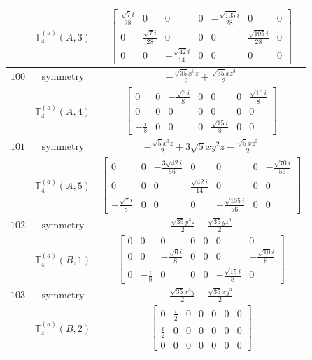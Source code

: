 \documentclass[fleqn,8pt,landscape]{jsarticle}
\begin{document}
\begin{longtable}{ccc}
$  $ & $ \mathbb{T}_{4}^{(a)}(A,3) $ & $ \begin{bmatrix} \frac{\sqrt{7} i}{28} & 0 & 0 & 0 & - \frac{\sqrt{105} i}{28} & 0 & 0 \\ 0 & \frac{\sqrt{7} i}{28} & 0 & 0 & 0 & \frac{\sqrt{105} i}{28} & 0 \\ 0 & 0 & - \frac{\sqrt{42} i}{14} & 0 & 0 & 0 & 0 \end{bmatrix} $ \\ \hline
$ 100 $ & $ \text{symmetry} $ & $ - \frac{\sqrt{35} x^{3} z}{2} + \frac{\sqrt{35} x z^{3}}{2} $ \\
$  $ & $ \mathbb{T}_{4}^{(a)}(A,4) $ & $ \begin{bmatrix} 0 & 0 & - \frac{\sqrt{6} i}{8} & 0 & 0 & 0 & \frac{\sqrt{10} i}{8} \\ 0 & 0 & 0 & 0 & 0 & 0 & 0 \\ - \frac{i}{8} & 0 & 0 & 0 & \frac{\sqrt{15} i}{8} & 0 & 0 \end{bmatrix} $ \\ \hline
$ 101 $ & $ \text{symmetry} $ & $ - \frac{\sqrt{5} x^{3} z}{2} + 3 \sqrt{5} x y^{2} z - \frac{\sqrt{5} x z^{3}}{2} $ \\
$  $ & $ \mathbb{T}_{4}^{(a)}(A,5) $ & $ \begin{bmatrix} 0 & 0 & - \frac{3 \sqrt{42} i}{56} & 0 & 0 & 0 & - \frac{\sqrt{70} i}{56} \\ 0 & 0 & 0 & \frac{\sqrt{42} i}{14} & 0 & 0 & 0 \\ - \frac{\sqrt{7} i}{8} & 0 & 0 & 0 & - \frac{\sqrt{105} i}{56} & 0 & 0 \end{bmatrix} $ \\ \hline
$ 102 $ & $ \text{symmetry} $ & $ \frac{\sqrt{35} y^{3} z}{2} - \frac{\sqrt{35} y z^{3}}{2} $ \\
$  $ & $ \mathbb{T}_{4}^{(a)}(B,1) $ & $ \begin{bmatrix} 0 & 0 & 0 & 0 & 0 & 0 & 0 \\ 0 & 0 & - \frac{\sqrt{6} i}{8} & 0 & 0 & 0 & - \frac{\sqrt{10} i}{8} \\ 0 & - \frac{i}{8} & 0 & 0 & 0 & - \frac{\sqrt{15} i}{8} & 0 \end{bmatrix} $ \\ \hline
$ 103 $ & $ \text{symmetry} $ & $ \frac{\sqrt{35} x^{3} y}{2} - \frac{\sqrt{35} x y^{3}}{2} $ \\
$  $ & $ \mathbb{T}_{4}^{(a)}(B,2) $ & $ \begin{bmatrix} 0 & \frac{i}{2} & 0 & 0 & 0 & 0 & 0 \\ \frac{i}{2} & 0 & 0 & 0 & 0 & 0 & 0 \\ 0 & 0 & 0 & 0 & 0 & 0 & 0 \end{bmatrix} $ \\ \hline

\end{longtable}
\end{document}
